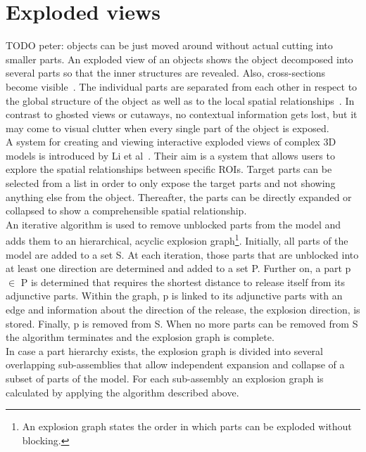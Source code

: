 \section{Exploded views}
TODO peter: objects can be just moved around without actual cutting into smaller parts.
An exploded view of an objects shows the object decomposed into several parts so that the inner structures are revealed. Also, cross-sections become visible~\cite{jour:explodedView}. The individual parts are separated from each other in respect to the global structure of the object as well as to the local spatial relationships~\cite{jour:generationExplodedView}. In contrast to ghosted views or cutaways, no contextual information gets lost, but it may come to visual clutter when every single part of the object is exposed.\\
\newline
A system for creating and viewing interactive exploded views of complex 3D models is introduced by Li et al~\cite{jour:generationExplodedView}. Their aim is a system that allows users to explore the spatial relationships between specific ROIs. Target parts can be selected from a list in order to only expose the target parts and not showing anything else from the object. Thereafter, the parts can be directly expanded or collapsed to show a comprehensible spatial relationship.\\
An iterative algorithm is used to remove unblocked parts from the model and adds them to an hierarchical, acyclic explosion graph\footnote{An explosion graph states the order in which parts can be exploded without blocking.}. Initially, all parts of the model are added to a set S. At each iteration, those parts that are unblocked into at least one direction are determined and added to a set P. Further on, a part p $\in$ P is determined that requires the shortest distance to release itself from its adjunctive parts. Within the graph, p is linked to its adjunctive parts with an edge and information about the direction of the release, the explosion direction, is stored. Finally, p is removed from S. When no more parts can be removed from S the algorithm terminates and the explosion graph is complete.\\
In case a part hierarchy exists, the explosion graph is divided into several overlapping sub-assemblies that allow independent expansion and collapse of a subset of parts of the model. For each sub-assembly an explosion graph is calculated by applying the algorithm described above.\\
\newline
